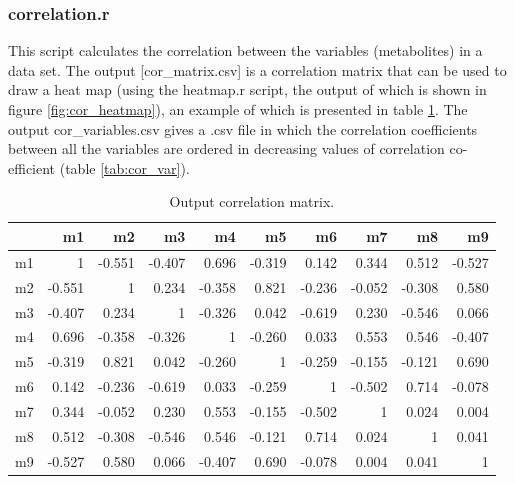 \documentclass[english,a4paper,12pt]{article}
\begin{document}
\subsubsection*{correlation.r}
This script calculates the correlation between the variables (metabolites) in a data set. The output [\textsf{cor\_matrix.csv}] is a correlation matrix that can be used to draw a heat map (using the \textsf{heatmap.r} script, the output of which is shown in figure \ref{fig:cor_heatmap}), an example of which is presented in table \ref{tab:cor_mat}. The output \textsf{cor\_variables.csv} gives a .csv file in which the correlation coefficients  between all the variables  are ordered in decreasing values of correlation co-efficient (table \ref{tab:cor_var}).

\begin{table}[p]
\caption[Correlation matrix]{Output correlation matrix.}
\begin{center}
\begin{tabular}{lrrrrrrrrr}
\toprule
  & m1 & m2 & m3 & m4 & m5 & m6 & m7 & m8 & m9\\
\midrule
  m1 & 1 & -0.551 & -0.407 & 0.696 & -0.319 & 0.142 & 0.344 & 0.512 & -0.527\\
  m2 & -0.551 & 1 & 0.234 & -0.358 & 0.821 & -0.236 & -0.052 & -0.308 & 0.580\\
  m3 & -0.407 & 0.234 & 1 & -0.326 & 0.042 & -0.619 & 0.230 & -0.546 & 0.066\\
  m4 & 0.696 & -0.358 & -0.326 & 1 & -0.260 & 0.033 & 0.553 & 0.546 & -0.407\\
  m5 & -0.319 & 0.821 & 0.042 & -0.260 & 1 & -0.259 & -0.155 & -0.121 & 0.690\\
  m6 & 0.142 & -0.236 & -0.619 & 0.033 & -0.259 & 1 & -0.502 & 0.714 & -0.078\\
  m7 & 0.344 & -0.052 & 0.230 & 0.553 & -0.155 & -0.502 & 1 & 0.024 & 0.004\\
  m8 & 0.512 & -0.308 & -0.546 & 0.546 & -0.121 & 0.714 & 0.024 & 1 & 0.041\\
  m9 & -0.527 & 0.580 & 0.066 & -0.407 & 0.690 & -0.078 & 0.004 & 0.041 & 1\\
\bottomrule
\end{tabular}
\end{center}
\label{tab:cor_mat}
\end{table}
\end{document}
